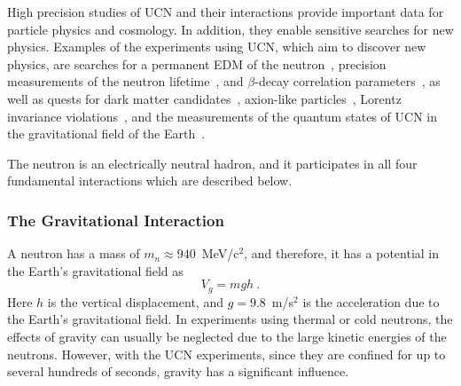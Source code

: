 High precision studies of UCN and their interactions provide important
data for particle physics and cosmology. In addition, they enable
sensitive searches for new physics. Examples of the experiments using
UCN, which aim to discover new physics, are searches for a permanent
EDM of the
neutron~\cite{Baker2006,Serebrov2009,Lam_Gol,Altarev2010,Pendlebury2015},
precision measurements of the neutron
lifetime~\cite{pattie2018measurement,Paul2009,Wietfeldt2011,Arzumanov2000,Serebrov2005,Huffman},
and $\beta$-decay correlation
parameters~\cite{plaster2012measurement,Mendenhall,Broussard}, as well
as quests for dark matter candidates~\cite{Serebrov2008,Zimmer2010},
axion-like particles~\cite{Baessler,Serebrov2010,Afach2015}, Lorentz
invariance violations~\cite{Altarev2009}, and the measurements of the
quantum states of UCN in the gravitational field of the
Earth~\cite{Nesvizhevsky2003}.


The neutron is an electrically neutral hadron, and it participates in
all four fundamental interactions which are described below.


\subsubsection{The Gravitational Interaction}
A neutron has a mass of $m_n\approx 940$~MeV/c$^2$, and therefore, it has a
potential in the Earth's gravitational field as
\begin{equation}
V_g=mgh~.
\end{equation}
Here $h$ is the vertical displacement, and $g=9.8$~m/s$^2$ is the
acceleration due to the Earth's gravitational field.  In experiments
using thermal or cold neutrons, the effects of gravity can usually be
neglected due to the large kinetic energies of the neutrons. However,
with the UCN experiments, since they are confined for up to several
hundreds of seconds, gravity has a significant influence.

